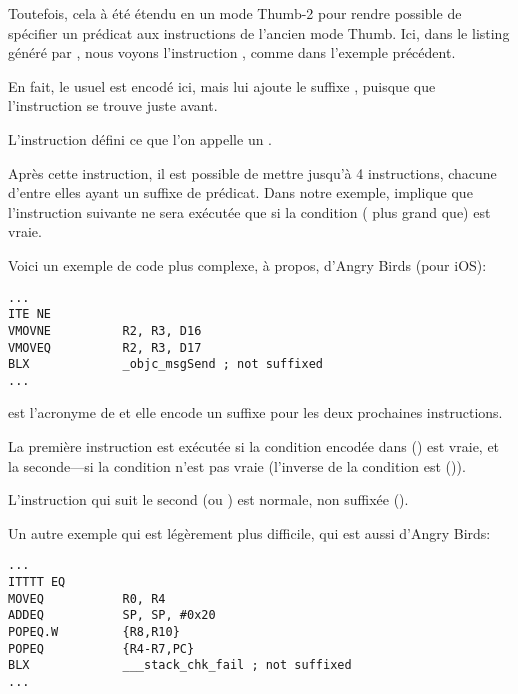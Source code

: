 
Toutefois, cela à été étendu en un mode Thumb-2 pour rendre possible de spécifier
un prédicat aux instructions de l'ancien mode Thumb.
Ici, dans le listing généré par \IDA, nous voyons l'instruction , comme
dans l'exemple précédent.

En fait, le  usuel est encodé ici, mais \IDA lui ajoute le suffixe ,
puisque que l'instruction  se trouve juste avant.

\label{ARM_Thumb_IT}
L'instruction  défini ce que l'on appelle un .

Après cette instruction, il est possible de mettre jusqu'à 4 instructions, chacune
d'entre elles ayant un suffixe de prédicat.
Dans notre exemple,  implique que l'instruction suivante ne sera exécutée
que si la condition  ( plus grand que) est vraie.

Voici un exemple de code plus complexe, à propos, d'Angry Birds (pour iOS):

\begin{lstlisting}[caption=Angry Birds Classic,style=customasmARM]
...
ITE NE
VMOVNE          R2, R3, D16
VMOVEQ          R2, R3, D17
BLX             _objc_msgSend ; not suffixed
...
\end{lstlisting}

 est l'acronyme de 
et elle encode un suffixe pour les deux prochaines instructions.

La première instruction est exécutée si la condition encodée dans  ()
est vraie, et la seconde---si la condition n'est pas vraie (l'inverse de la condition
 est  ()).

L'instruction qui suit le second  (ou ) est normale, non suffixée
().

Un autre exemple qui est légèrement plus difficile, qui est aussi d'Angry Birds:

\begin{lstlisting}[caption=Angry Birds Classic,style=customasmARM]
...
ITTTT EQ
MOVEQ           R0, R4
ADDEQ           SP, SP, #0x20
POPEQ.W         {R8,R10}
POPEQ           {R4-R7,PC}
BLX             ___stack_chk_fail ; not suffixed
...
\end{lstlisting}

